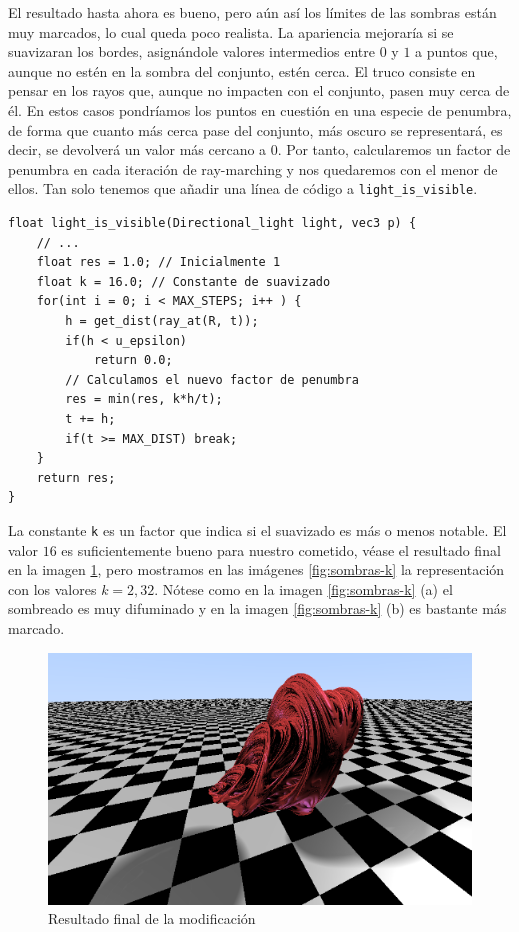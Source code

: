 El resultado hasta ahora es bueno, pero aún así los límites de las sombras están muy marcados, lo cual queda poco realista. La apariencia mejoraría si se suavizaran los bordes, asignándole valores intermedios entre $0$ y $1$ a puntos que, aunque no estén en la sombra del conjunto, estén cerca. El truco consiste en pensar en los rayos que, aunque no impacten con el conjunto, pasen muy cerca de él. En estos casos pondríamos los puntos en cuestión en una especie de penumbra, de forma que cuanto más cerca pase del conjunto, más oscuro se representará, es decir, se devolverá un valor más cercano a $0$. Por tanto, calcularemos un factor de penumbra en cada iteración de ray-marching y nos quedaremos con el menor de ellos. Tan solo tenemos que añadir una línea de código a \verb|light_is_visible|.

\begin{lstlisting}
float light_is_visible(Directional_light light, vec3 p) {
    // ... 
    float res = 1.0; // Inicialmente 1
    float k = 16.0; // Constante de suavizado
    for(int i = 0; i < MAX_STEPS; i++ ) {
        h = get_dist(ray_at(R, t));
        if(h < u_epsilon)
            return 0.0;
        // Calculamos el nuevo factor de penumbra
        res = min(res, k*h/t); 
        t += h;
        if(t >= MAX_DIST) break;
    }
    return res;
}
\end{lstlisting}

La constante \verb|k| es un factor que indica si el suavizado es más o menos notable. El valor $16$ es suficientemente bueno para nuestro cometido, véase el resultado final en la imagen \ref{fig:sombras-final}, pero mostramos en las imágenes \ref{fig:sombras-k} la representación con los valores $k=2,32$. Nótese como en la imagen \ref{fig:sombras-k} (a) el sombreado es muy difuminado y en la imagen \ref{fig:sombras-k} (b) es bastante más marcado.

\begin{figure} [ht]
    \centering
    \includegraphics[scale = 0.45]{img/C8/sombras-final.png}
    \caption{Resultado final de la modificación}
    \label{fig:sombras-final}
\end{figure}



